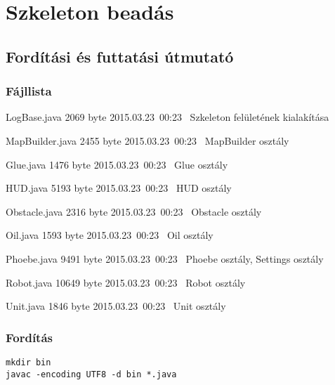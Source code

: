 %
\chapter{Szkeleton beadás}

\thispagestyle{fancy}

\section{Fordítási és futtatási útmutató}

\subsection{Fájllista}

\begin{fajllista}

\fajl
{LogBase.java} %
{2069 byte} %
{2015.03.23~00:23~} %
{Szkeleton felületének kialakítása} %

\fajl
{MapBuilder.java}
{2455 byte}
{2015.03.23~00:23~}
{MapBuilder osztály}

\fajl
{Glue.java}
{1476 byte}
{2015.03.23~00:23~}
{Glue osztály}

\fajl
{HUD.java}
{5193 byte}
{2015.03.23~00:23~}
{HUD osztály}

\fajl
{Obstacle.java}
{2316 byte}
{2015.03.23~00:23~}
{Obstacle osztály}

\fajl
{Oil.java}
{1593 byte}
{2015.03.23~00:23~}
{Oil osztály}

\fajl
{Phoebe.java}
{9491 byte}
{2015.03.23~00:23~}
{Phoebe osztály, Settings osztály}

\fajl
{Robot.java}
{10649 byte}
{2015.03.23~00:23~}
{Robot osztály}

\fajl
{Unit.java}
{1846 byte}
{2015.03.23~00:23~}
{Unit osztály}

\end{fajllista}

\subsection{Fordítás}

\lstset{escapeinside=`', xleftmargin=10pt, frame=single, basicstyle=\ttfamily\footnotesize, language=sh}
\begin{lstlisting}
mkdir bin
javac -encoding UTF8 -d bin *.java
\end{lstlisting}

